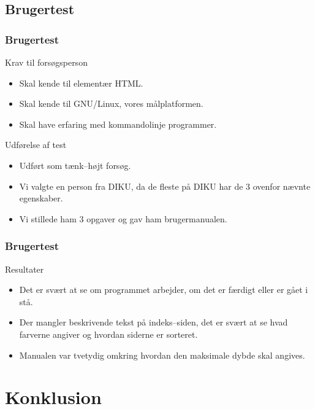 \documentclass{beamer}
\begin{document}
\subsection{Brugertest}
\begin{frame}
  \frametitle{Brugertest}

  \begin{block}{Krav til forsøgsperson}
    \begin{itemize}
    \item Skal kende til elementær HTML.
    \item Skal kende til GNU/Linux, vores målplatformen.
    \item Skal have erfaring med kommandolinje programmer.
    \end{itemize}
  \end{block}
\pause

Udførelse af test
  \begin{itemize}
  \item Udført som tænk--højt forsøg.
  \item Vi valgte en person fra DIKU, da de fleste på DIKU har de 3
    ovenfor nævnte egenskaber.
  \item Vi stillede ham 3 opgaver og gav ham brugermanualen.
  \end{itemize}
\end{frame}

\begin{frame}
  \frametitle{Brugertest}
  Resultater
  \begin{itemize}
  \item Det er svært at se om programmet arbejder, om det er færdigt
    eller er gået i stå.
  \item Der mangler beskrivende tekst på indeks--siden, det er svært
    at se hvad farverne angiver og hvordan siderne er sorteret.
  \item Manualen var tvetydig omkring hvordan den maksimale dybde skal
    angives.
  \end{itemize}

\end{frame}

\section{Konklusion}
\end{document}
